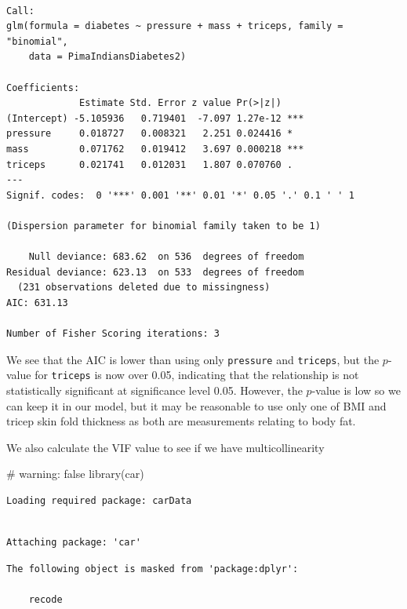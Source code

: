 \documentclass[
  letterpaper,
  DIV=11,
  numbers=noendperiod]{scrreprt}
\newenvironment{Shaded}{\begin{snugshade}}{\end{snugshade}}
\newcommand{\CommentTok}[1]{\textcolor[rgb]{0.37,0.37,0.37}{#1}}
\newcommand{\FunctionTok}[1]{\textcolor[rgb]{0.28,0.35,0.67}{#1}}
\newcommand{\NormalTok}[1]{\textcolor[rgb]{0.00,0.23,0.31}{#1}}
\begin{document}
\begin{verbatim}

Call:
glm(formula = diabetes ~ pressure + mass + triceps, family = "binomial", 
    data = PimaIndiansDiabetes2)

Coefficients:
             Estimate Std. Error z value Pr(>|z|)    
(Intercept) -5.105936   0.719401  -7.097 1.27e-12 ***
pressure     0.018727   0.008321   2.251 0.024416 *  
mass         0.071762   0.019412   3.697 0.000218 ***
triceps      0.021741   0.012031   1.807 0.070760 .  
---
Signif. codes:  0 '***' 0.001 '**' 0.01 '*' 0.05 '.' 0.1 ' ' 1

(Dispersion parameter for binomial family taken to be 1)

    Null deviance: 683.62  on 536  degrees of freedom
Residual deviance: 623.13  on 533  degrees of freedom
  (231 observations deleted due to missingness)
AIC: 631.13

Number of Fisher Scoring iterations: 3
\end{verbatim}

We see that the AIC is lower than using only \texttt{pressure} and
\texttt{triceps}, but the \(p\)-value for \texttt{triceps} is now over
0.05, indicating that the relationship is not statistically significant
at significance level 0.05. However, the \(p\)-value is low so we can
keep it in our model, but it may be reasonable to use only one of BMI
and tricep skin fold thickness as both are measurements relating to body
fat.

We also calculate the VIF value to see if we have multicollinearity

\begin{Shaded}
\begin{Highlighting}[]
\CommentTok{\# warning: false}
\FunctionTok{library}\NormalTok{(car)}
\end{Highlighting}
\end{Shaded}

\begin{verbatim}
Loading required package: carData
\end{verbatim}

\begin{verbatim}

Attaching package: 'car'
\end{verbatim}

\begin{verbatim}
The following object is masked from 'package:dplyr':

    recode
\end{verbatim}
\end{document}
